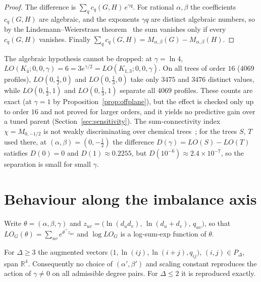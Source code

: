   \begin{proof}
  The difference is $\sum_q c_q(G,H)\, e^{\gamma q}$. For rational
  $\alpha, \beta$ the coefficients $c_q(G,H)$ are algebraic, and the
  exponents $\gamma q$ are distinct algebraic numbers, so by the
  Lindemann--Weierstrass theorem~\cite{Baker1975} the sum vanishes only
  if every $c_q(G,H)$ vanishes. Finally
  $\sum_q c_q(G,H) = M_{\alpha,\beta}(G) - M_{\alpha,\beta}(H)$.
  \end{proof}

  The algebraic hypothesis cannot be dropped: at $\gamma = \ln 4$,
  $LO(K_4;0,0,\gamma) = 6 = 3e^{\gamma/2} = LO(K_{1,3};0,0,\gamma)$. On
  all trees of order $16$ ($4069$ profiles), $LO(0,\tfrac12,0)$ and
  $LO(0,\tfrac13,0)$ take only $3475$ and $3476$ distinct values, while
  $LO(0,\tfrac12,1)$ and $LO(0,\tfrac13,1)$ separate all $4069$ profiles. These counts are exact (at
  $\gamma = 1$ by Proposition~\ref{prop:offplane}), but the effect is checked
  only up to order $16$ and not proved for larger orders, and it
  yields no predictive gain over a tuned parent
  (Section~\ref{sec:sensitivity}). The
  sum-connectivity index $\chi = M_{0,-1/2}$ is not weakly discriminating
  over chemical trees~\cite[Example~2.2]{RadaRodriguezSigarreta2022Weak};
  for the trees $S$, $T$ used there, at $(\alpha,\beta) = (0,-\tfrac12)$
  the difference $D(\gamma) = LO(S) - LO(T)$ satisfies $D(0) = 0$ and
  $D(1) \approx 0.2255$, but $D(10^{-6}) \approx 2.4 \times 10^{-7}$, so
  the separation is small for small $\gamma$.

\section{Behaviour along the imbalance axis}\label{sec:geometry}

  Write $\theta = (\alpha, \beta, \gamma)$ and
  $z_{uv} = \bigl(\ln(d_u d_v),\, \ln(d_u + d_v),\, q_{uv}\bigr)$, so that
  $LO_G(\theta) = \sum_{uv} e^{\theta^{\top} z_{uv}}$ and
  $\log LO_G$ is a log-sum-exp function of $\theta$.

  \begin{lemma}\label{prop:indep}
  For $\Delta \ge 3$ the augmented vectors
  $\bigl(1, \ln(ij), \ln(i+j), q_{ij}\bigr)$, $(i,j) \in P_{\Delta}$,
  span $\mathbb{R}^4$. Consequently no choice of $(\alpha', \beta')$ and
  scaling constant reproduces the action of $\gamma \neq 0$ on all
  admissible degree pairs. For $\Delta \le 2$ it is reproduced exactly.
  \end{lemma}

